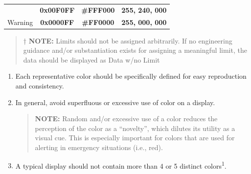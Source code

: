 \documentclass[
]{book}
\begin{document}
\begin{enumerate}
\begin{enumerate}
\begin{longtable}[]{@{}lccc@{}}
\begin{minipage}[t]{0.30\columnwidth}
    \end{minipage} & \begin{minipage}[t]{0.19\columnwidth}\centering
    \textbf{\colorbox[HTML]{000000}{\textcolor[HTML]{FFF000}{0x00F0FF}}}\strut
    \end{minipage} & \begin{minipage}[t]{0.19\columnwidth}\centering
    \textbf{\colorbox[HTML]{000000}{\textcolor[HTML]{FFF000}{#FFF000}}}\strut
    \end{minipage} & \begin{minipage}[t]{0.21\columnwidth}\centering
    \textbf{\colorbox[HTML]{000000}{\textcolor[HTML]{FFF000}{255, 240, 000}}}\strut
    \end{minipage}\tabularnewline
    \begin{minipage}[t]{0.30\columnwidth}\raggedright
    Warning\strut
    \end{minipage} & \begin{minipage}[t]{0.19\columnwidth}\centering
    \textbf{\colorbox[HTML]{000000}{\textcolor[HTML]{FF0000}{0x0000FF}}}\strut
    \end{minipage} & \begin{minipage}[t]{0.19\columnwidth}\centering
    \textbf{\colorbox[HTML]{000000}{\textcolor[HTML]{FF0000}{#FF0000}}}\strut
    \end{minipage} & \begin{minipage}[t]{0.21\columnwidth}\centering
    \textbf{\colorbox[HTML]{000000}{\textcolor[HTML]{FF0000}{255, 000, 000}}}\strut
    \end{minipage}\tabularnewline
    \bottomrule
    \end{longtable}

    \begin{quote}
    † \textbf{NOTE:} Limits should not be assigned arbitrarily. If no engineering guidance and/or substantiation exists for assigning a meaningful limit, the data should be displayed as Data w/no Limit
    \end{quote}

    \begin{enumerate}
    \def\labelenumiii{\arabic{enumiii}.}
    \setcounter{enumiii}{4}
    \item
      Each representative color should be specifically defined for easy reproduction and consistency.
    \item
      In general, avoid superfluous or excessive use of color on a display.

      \begin{quote}
      \textbf{NOTE:} Random and/or excessive use of a color reduces the perception of the color as a ``novelty'', which dilutes its utility as a visual cue. This is especially important for colors that are used for alerting in emergency situations (i.e., red).
      \end{quote}
    \item
      A typical display should not contain more than 4 or 5 distinct colors\textsuperscript{1}.


\end{enumerate}
\end{enumerate}
\end{enumerate}
\end{document}
